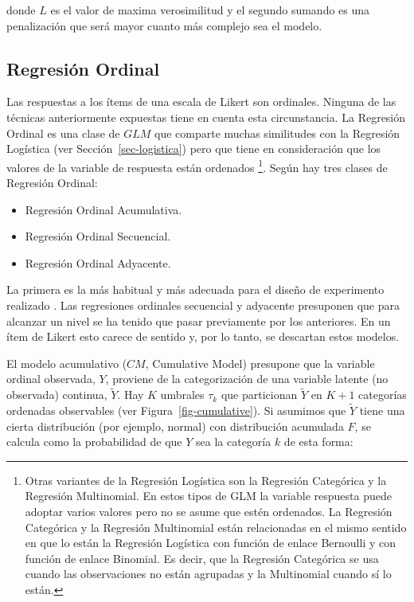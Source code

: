 \documentclass[
  12pt,
  a4paper,
  extrafontsizes,
  onecolumn,
  openright,
  table]{memoir}
\providecommand{\tightlist}{%
  \setlength{\itemsep}{0pt}\setlength{\parskip}{0pt}}\usepackage{longtable,booktabs,array}
\begin{document}
donde \(L\) es el valor de maxima verosimilitud y el segundo sumando es
una penalización que será mayor cuanto más complejo sea el modelo.

\hypertarget{sec-ordinal}{%
\subsection{Regresión Ordinal}\label{sec-ordinal}}

Las respuestas a los ítems de una escala de Likert son ordinales.
Ninguna de las técnicas anteriormente expuestas tiene en cuenta esta
circunstancia. La Regresión Ordinal es una clase de \(GLM\) que comparte
muchas similitudes con la Regresión Logística (ver
Sección~\ref{sec-logistica}) pero que tiene en consideración que los
valores de la variable de respuesta están ordenados \footnote{Otras
  variantes de la Regresión Logística son la Regresión Categórica y la
  Regresión Multinomial. En estos tipos de GLM la variable respuesta
  puede adoptar varios valores pero no se asume que estén ordenados. La
  Regresión Categórica y la Regresión Multinomial están relacionadas en
  el mismo sentido en que lo están la Regresión Logística con función de
  enlace Bernoulli y con función de enlace Binomial. Es decir, que la
  Regresión Categórica se usa cuando las observaciones no están
  agrupadas y la Multinomial cuando sí lo están.}. Según
\textcite{burkner2019} hay tres clases de Regresión Ordinal:

\begin{itemize}
\tightlist
\item
  Regresión Ordinal Acumulativa.
\item
  Regresión Ordinal Secuencial.
\item
  Regresión Ordinal Adyacente.
\end{itemize}

La primera es la más habitual y más adecuada para el diseño de
experimento realizado \autocite[ver][pp.~23-24]{burkner2019}. Las
regresiones ordinales secuencial y adyacente presuponen que para
alcanzar un nivel se ha tenido que pasar previamente por los anteriores.
En un ítem de Likert esto carece de sentido y, por lo tanto, se
descartan estos modelos.

El modelo acumulativo (\(CM\), Cumulative Model) presupone que la
variable ordinal observada, \(Y\), proviene de la categorización de una
variable latente (no observada) continua, \(\tilde{Y}\). Hay \(K\)
umbrales \(\tau_k\) que particionan \(\tilde{Y}\) en \(K + 1\)
categorías ordenadas observables (ver Figura~\ref{fig-cumulative}). Si
asumimos que \(\tilde{Y}\) tiene una cierta distribución (por ejemplo,
normal) con distribución acumulada \(F\), se calcula como la
probabilidad de que \(Y\) sea la categoría \(k\) de esta forma:
\end{document}
